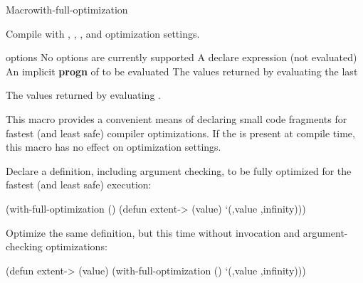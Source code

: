 \documentclass[10pt,twoside,english,pdftex]{article}
\begin{document}

\begin{functiondoc}{Macro}{with-full-optimization}%
  {
    }
%
  
\fnsyntax

\fnpurpose Compile  with ,
, , and
 optimization settings.

\fnpackage {}

\fnmodule {}

\fnargs
\begin{args}{options}
\arg[option] No options are currently supported
\arg[declaration] A declare expression (not evaluated)
\arg[forms] An implicit \textbf{progn} of  to be evaluated
\arg[results] The values returned by evaluating the last 
\end{args}

\fnreturns The values returned by evaluating .

\fndescription This macro provides a convenient means of declaring small code
fragments for fastest (and least safe) compiler optimizations.  If the
  is present at
compile time, this macro has no effect on optimization settings.

\fnexamples Declare a  definition, including argument checking,
to be fully optimized for the fastest (and least safe) execution:
%
\W\supp
\begin{example}
  (with-full-optimization ()
    (defun extent-> (value)
      `(,value ,infinity)))
\end{example}
%
Optimize the same  definition, but this time without
invocation and argument-checking optimizations:
%
\W\supp\notpretop
\begin{example}
  (defun extent-> (value)
    (with-full-optimization ()
      `(,value ,infinity)))
\end{example}

\end{functiondoc}

\end{document}
